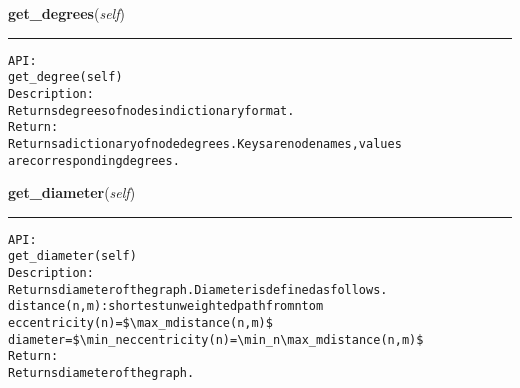     \label{coinor:gimpy:graph:Graph:get_degrees}

    \vspace{0.5ex}

\hspace{.8\funcindent}\begin{boxedminipage}{\funcwidth}

    \raggedright \textbf{get\_degrees}(\textit{self})

    \vspace{-1.5ex}

    \rule{\textwidth}{0.5\fboxrule}
\setlength{\parskip}{2ex}
\begin{alltt}

API:
    get\_degree(self)
Description:
    Returns degrees of nodes in dictionary format.
Return:
    Returns a dictionary of node degrees. Keys are node names, values
    are corresponding degrees.
\end{alltt}

\setlength{\parskip}{1ex}
    \end{boxedminipage}

    \label{coinor:gimpy:graph:Graph:get_diameter}

    \vspace{0.5ex}

\hspace{.8\funcindent}\begin{boxedminipage}{\funcwidth}

    \raggedright \textbf{get\_diameter}(\textit{self})

    \vspace{-1.5ex}

    \rule{\textwidth}{0.5\fboxrule}
\setlength{\parskip}{2ex}
\begin{alltt}

API:
    get\_diameter(self)
Description:
    Returns diameter of the graph. Diameter is defined as follows.
    distance(n,m): shortest unweighted path from n to m
    eccentricity(n) = \${\textbackslash}max \_m distance(n,m)\$
    diameter = \${\textbackslash}min \_n eccentricity(n) = {\textbackslash}min \_n {\textbackslash}max \_m distance(n,m)\$
Return:
    Returns diameter of the graph.
\end{alltt}

\setlength{\parskip}{1ex}
    \end{boxedminipage}


